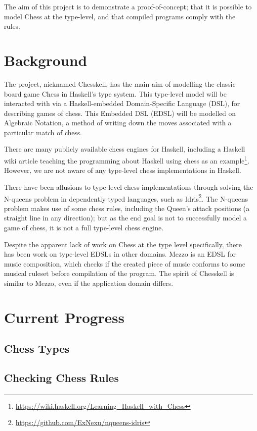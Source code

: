 \documentclass[12pt, a4paper]{scrartcl}
\begin{document}
The aim of this project is to demonstrate a proof-of-concept; that it is possible to model Chess at the type-level, and that compiled programs comply with the rules.

\section{Background}

The project, nicknamed Chesskell, has the main aim of modelling the classic board game Chess in Haskell's type system. This type-level model will be interacted with via a Haskell-embedded Domain-Specific Language (DSL), for describing games of chess. This Embedded DSL (EDSL) will be modelled on Algebraic Notation, a method of writing down the moves associated with a particular match of chess.

There are many publicly available chess engines for Haskell, including a Haskell wiki article teaching the programming about Haskell using chess as an example\footnote{\url{https://wiki.haskell.org/Learning_Haskell_with_Chess}}. However, we are not aware of any type-level chess implementations in Haskell.

There have been allusions to type-level chess implementations through solving the N-queens problem in dependently typed languages, such as Idris\cite{idrisnqueens}\footnote{\url{https://github.com/ExNexu/nqueens-idris}}. The N-queens problem makes use of some chess rules, including the Queen's attack positions (a straight line in any direction); but as the end goal is not to successfully model a game of chess, it is not a full type-level chess engine.

Despite the apparent lack of work on Chess at the type level specifically, there has been work on type-level EDSLs in other domains. Mezzo\cite{mezzo} is an EDSL for music composition, which checks if the created piece of music conforms to some musical ruleset before compilation of the program. The spirit of Chesskell is similar to Mezzo, even if the application domain differs.

\section{Current Progress}

\subsection{Chess Types}

\subsection{Checking Chess Rules}
\end{document}
